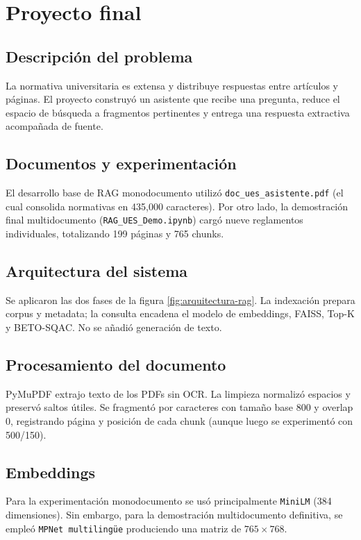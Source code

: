 \documentclass[12pt,letterpaper]{article}
\begin{document}
\section{Proyecto final}

\subsection{Descripción del problema}

La normativa universitaria es extensa y distribuye respuestas entre artículos
y páginas. El proyecto construyó un asistente que recibe una pregunta, reduce
el espacio de búsqueda a fragmentos pertinentes y entrega una respuesta
extractiva acompañada de fuente.

\subsection{Documentos y experimentación}

El desarrollo base de RAG monodocumento utilizó \texttt{doc\_ues\_asistente.pdf}
(el cual consolida normativas en 435,000 caracteres). Por otro lado, la demostración 
final multidocumento (\texttt{RAG\_UES\_Demo.ipynb}) cargó nueve reglamentos individuales, totalizando 199 páginas y 765 chunks.

\subsection{Arquitectura del sistema}

Se aplicaron las dos fases de la figura \ref{fig:arquitectura-rag}. La
indexación prepara corpus y metadata; la consulta encadena el modelo de embeddings, FAISS,
Top-K y BETO-SQAC. No se añadió generación de texto.

\subsection{Procesamiento del documento}

PyMuPDF extrajo texto de los PDFs sin OCR. La limpieza normalizó espacios
y preservó saltos útiles. Se fragmentó por caracteres con tamaño base 800 y overlap
0, registrando página y posición de cada chunk (aunque luego se experimentó con 500/150).

\subsection{Embeddings}

Para la experimentación monodocumento se usó principalmente \texttt{MiniLM} (384 dimensiones). 
Sin embargo, para la demostración multidocumento definitiva, se empleó \texttt{MPNet multilingüe}
produciendo una matriz de $765\times768$.
\end{document}

